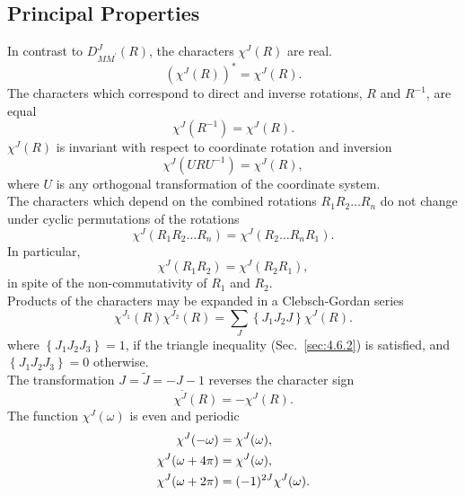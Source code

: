 \subsection{Principal Properties}\label{sec:4.14.3}
In contrast to $D_{M M^{\prime}}^{J}(R)$, the characters $\chi^{J}(R)$ are real.
\begin{equation}
\left(\chi^{J}(R)\right)^{*}=\chi^{J}(R) .\label{eq:4:14:16}
\end{equation}
The characters which correspond to direct and inverse rotations, $R$ and $R^{-1}$, are equal
\begin{equation}
\chi^{J}\left(R^{-1}\right)=\chi^{J}(R) .\label{eq:4:14:17}
\end{equation}
$\chi^{J}(R)$ is invariant with respect to coordinate rotation and inversion
\begin{equation}
\chi^{J}\left(U R U^{-1}\right)=\chi^{J}(R), \label{eq:4:14:18}
\end{equation}
where $U$ is any orthogonal transformation of the coordinate system.\\
The characters which depend on the combined rotations $R_{1} R_{2} \ldots R_{n}$ do not change under cyclic permutations of the rotations
\begin{equation}
\chi^{J}\left(R_{1} R_{2} \ldots R_{n}\right)=\chi^{J}\left(R_{2} \ldots R_{n} R_{1}\right) .\label{eq:4:14:19}
\end{equation}
In particular,
\begin{equation}
\chi^{J}\left(R_{1} R_{2}\right)=\chi^{J}\left(R_{2} R_{1}\right) \label{eq:4:14:20} ,
\end{equation}
in spite of the non-commutativity of $R_{1}$ and $R_{2}$.\\
Products of the characters may be expanded in a Clebsch-Gordan series
\begin{equation}
\chi^{J_{1}}(R) \chi^{J_{2}}(R)=\sum_{J}\left\{J_{1} J_{2} J\right\} \chi^{J}(R). \label{eq:4:14:21}
\end{equation}
where $\left\{J_{1} J_{2} J_{3}\right\}=1$, if the triangle inequality (Sec.~\ref{sec:4.6.2}) is satisfied, and $\left\{J_{1} J_{2} J_{3}\right\}=0$ otherwise.\\
The transformation $J=\tilde{J}=-J-1$ reverses the character sign
\begin{equation}
\chi^{\tilde{J}}(R)=-\chi^{J}(R). \label{eq:4:14:22}
\end{equation}
The function $\chi^{J}(\omega)$ is even and periodic
\begin{align}
\chi^{J}(-\omega) & =\chi^{J}(\omega),  \notag\\
\chi^{J}(\omega+4 \pi) & =\chi^{J}(\omega),  \label{eq:4:14:23}\\
\chi^{J}(\omega+2 \pi) & =(-1)^{2 J} \chi^{J}(\omega) . \notag
\end{align}
